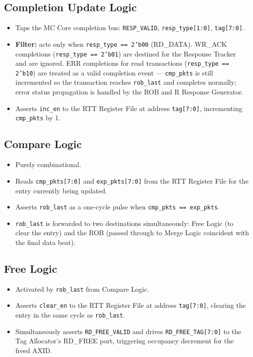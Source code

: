 \documentclass[11pt,a4paper]{article}
\begin{document}
\subsection{Completion Update Logic}

\begin{itemize}
  \item Taps the MC Core completion bus: \texttt{RESP\_VALID},
        \texttt{resp\_type[1:0]}, \texttt{tag[7:0]}.
  \item \textbf{Filter:} acts only when \texttt{resp\_type == 2'b00}
        (RD\_DATA). WR\_ACK completions (\texttt{resp\_type == 2'b01})
        are destined for the Response Tracker and are ignored. ERR
        completions for read transactions (\texttt{resp\_type == 2'b10})
        are treated as a valid completion event — \texttt{cmp\_pkts} is
        still incremented so the transaction reaches \texttt{rob\_last}
        and completes normally; error status propagation is handled by
        the ROB and R Response Generator.
  \item Asserts \texttt{inc\_en} to the RTT Register File at address
        \texttt{tag[7:0]}, incrementing \texttt{cmp\_pkts} by 1.
\end{itemize}

\subsection{Compare Logic}

\begin{itemize}
  \item Purely combinational.
  \item Reads \texttt{cmp\_pkts[7:0]} and \texttt{exp\_pkts[7:0]} from
        the RTT Register File for the entry currently being updated.
  \item Asserts \texttt{rob\_last} as a one-cycle pulse when
        \texttt{cmp\_pkts == exp\_pkts}.
  \item \texttt{rob\_last} is forwarded to two destinations
        simultaneously: Free Logic (to clear the entry) and the ROB
        (passed through to Merge Logic coincident with the final data
        beat).
\end{itemize}

\subsection{Free Logic}

\begin{itemize}
  \item Activated by \texttt{rob\_last} from Compare Logic.
  \item Asserts \texttt{clear\_en} to the RTT Register File at address
        \texttt{tag[7:0]}, clearing the entry in the same cycle as
        \texttt{rob\_last}.
  \item Simultaneously asserts \texttt{RD\_FREE\_VALID} and drives
        \texttt{RD\_FREE\_TAG[7:0]} to the Tag Allocator's RD\_FREE
        port, triggering occupancy decrement for the freed AXID.
\end{itemize}
\end{document}
